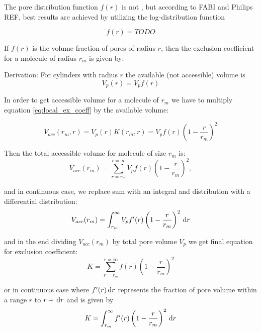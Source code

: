 The pore distribution function $f(r)$ is not , but according to FABI and
Philips REF, best results are achieved by utilizing the log-distribution function

\begin{equation}
    f(r) = TODO
\end{equation}

If $f(r)$ is the volume fraction of pores of radius $r$, then the exclusion
coefficient for a molecule of radius $r_m$ is given by:

Derivation:
For cylinders with radius $r$ the available (not accessible) volume is
\begin{equation}
    V_p(r) = V_pf(r)
\end{equation}

In order to get accessible volume for a  molecule of $r_m$ we have to multiply
equation \ref{eq:local_ex_coeff} by the available volume:

\begin{equation}
    V_{acc}(r_m, r) = V_p(r) K(r_m, r) = V_p f(r) \left(1-\frac{r}{r_m}\right)^2
\end{equation}

Then the total accessible volume for molecule of size $r_m$ is:
\begin{equation}
    V_{acc}(r_m) = \sum_{r=r_m}^{r=\infty} V_p f(r)
    \left(1-\frac{r}{r_m}\right)^2,
\end{equation}

and in continuous case, we replace sum with an integral and distribution with a
differential distribution:
\begin{equation}
    V_{acc}(r_m) = \int_{r_m}^{\infty} V_p f'(r)
    \left(1-\frac{r}{r_m}\right)^2\,\mathrm{d} r
\end{equation}

and in the end dividing $V_{acc}(r_m)$ by total pore volume $V_p$ we get final
equation for exclusion coefficient:
\begin{equation}
    K = \sum_{r = r_m}^{r = \infty} f(r)\left(1 - \frac{r}{r_m}\right)^2
\end{equation}

or in continuous case where $f'(r)\,\mathrm{d} r$ represents the fraction of pore volume
within a range $r$ to $r+\,\mathrm{d} r$ and is given by
\begin{equation}
    K = \int_{r_m}^{\infty} f'(r)\left(1 - \frac{r}{r_m}\right)^2\,\mathrm{d} r
\end{equation}
